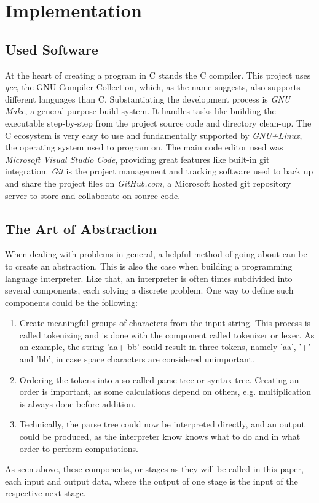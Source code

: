 \documentclass[12pt,a4paper,man]{apa7}
\newcommand{\pagelabel}[1]{\phantomsection\label{#1}}
\begin{document}
\section{Implementation}
\subsection{Used Software}
At the heart of creating a program in C stands the C compiler. This project uses
\emph{gcc}, the GNU Compiler Collection, which, as the name suggests, also 
supports different languages than C. Substantiating the development process is 
\emph{GNU Make}, a general-purpose build system. It handles tasks like building
the executable step-by-step from the project source code and directory clean-up.
The C ecosystem is very easy to use and fundamentally supported by 
\emph{GNU+Linux}, the operating system used to program on.
The main code editor used was \emph{Microsoft Visual Studio Code}, providing great
features like built-in git integration.
\emph{Git} is the project management and tracking software used to back up and share
the project files on \emph{GitHub.com}, a Microsoft hosted git repository server to
store and collaborate on source code.

\subsection{The Art of Abstraction}
When dealing with problems in general, a helpful method of going about can be
to create an abstraction. This is also the case when building a programming
language interpreter. Like that, an interpreter is often times subdivided into several
components, each solving a discrete problem. One way to define
such components could be the following:
\begin{enumerate}\pagelabel{simple interpreter}
    \item Create meaningful groups of characters from the input string. This
        process is called tokenizing and is done with the component called
        tokenizer or lexer. As an example, the string 'aa+  bb' could result
        in three tokens, namely 'aa', '+' and 'bb', in case space characters
        are considered unimportant.
    \item Ordering the tokens into a so-called parse-tree or syntax-tree.
        Creating an order is important, as some calculations depend on others, e.g. multiplication
        is always done before addition. %
    \item Technically, the parse tree could now be interpreted directly, and
        an output could be produced, as the interpreter know knows what to do
        and in what order to perform computations.
\end{enumerate}
As seen above, these components, or stages as they will be called in this paper,
each input and output data, where the output of one stage is the input of the
respective next stage.
\end{document}
